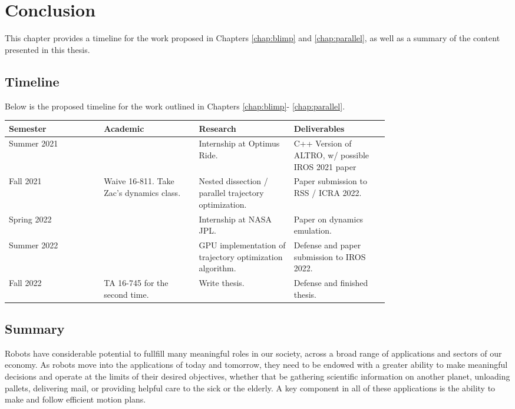 \documentclass[../root.tex]{subfiles}
\begin{document}
\chapter{Conclusion} \label{chap:conclusion}
This chapter provides a timeline for the work proposed in Chapters \ref{chap:blimp}
and \ref{chap:parallel}, as well as a summary of the content presented in this 
thesis. 

\section{Timeline}
Below is the proposed timeline for the work outlined in Chapters \ref{chap:blimp}-
\ref{chap:parallel}.
\begin{table*}[h]
    \begin{tabular}{l p{0.25\linewidth} p{0.25\linewidth} p{0.25\linewidth}}
        Semester & Academic & Research & Deliverables \\
        \midrule
        Summer 2021 
            & 
            & Internship at Optimus Ride. 
            & C++ Version of ALTRO, w/ possible IROS 2021 paper \\
        Fall 2021   
            & Waive 16-811. Take Zac's dynamics class. 
            & Nested dissection / parallel trajectory optimization.
            & Paper submission to RSS / ICRA 2022. \\
        Spring 2022 
            & 
            & Internship at NASA JPL.
            & Paper on dynamics emulation. \\
        Summer 2022
            & 
            & GPU implementation of trajectory optimization algorithm.
            & Defense and paper submission to IROS 2022. \\
        Fall 2022
            & TA 16-745 for the second time.
            & Write thesis. 
            & Defense and finished thesis.
    \end{tabular}
\end{table*}

\section{Summary}
Robots have considerable potential to fullfill many meaningful roles 
in our society, across a broad range of applications and sectors of 
our economy. As robots move into the applications of today and tomorrow,
they need to be endowed with a greater ability to make meaningful 
decisions and operate at the limits of their desired objectives, 
whether that be gathering scientific information on another planet,
unloading pallets, delivering mail, or providing helpful care to 
the sick or the elderly. A key component in all of these applications 
is the ability to make and follow efficient motion plans.
\end{document}
